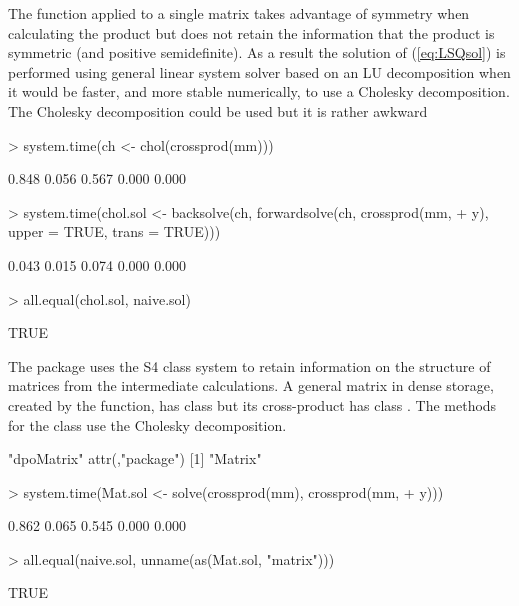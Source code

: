 \documentclass{article}
\begin{document}
The  function applied to a single matrix takes
advantage of symmetry when calculating the product but does not retain
the information that the product is symmetric (and positive
semidefinite).  As a result the solution of (\ref{eq:LSQsol}) is
performed using general linear system solver based on an LU
decomposition when it would be faster, and more stable numerically, to
use a Cholesky decomposition.  The Cholesky decomposition could be used
but it is rather awkward
\begin{Schunk}
\begin{Sinput}
> system.time(ch <- chol(crossprod(mm)))
\end{Sinput}
\begin{Soutput}
[1] 0.848 0.056 0.567 0.000 0.000
\end{Soutput}
\begin{Sinput}
> system.time(chol.sol <- backsolve(ch, forwardsolve(ch, crossprod(mm, 
+     y), upper = TRUE, trans = TRUE)))
\end{Sinput}
\begin{Soutput}
[1] 0.043 0.015 0.074 0.000 0.000
\end{Soutput}
\begin{Sinput}
> all.equal(chol.sol, naive.sol)
\end{Sinput}
\begin{Soutput}
[1] TRUE
\end{Soutput}
\end{Schunk}

The  package uses the S4 class system
\citep{R:Chambers:1998} to retain information on the structure of
matrices from the intermediate calculations.  A general matrix in
dense storage, created by the  function, has class
 but its cross-product has class .
The  methods for the  class use the
Cholesky decomposition.
\begin{Schunk}
\begin{Soutput}
[1] "dpoMatrix"
attr(,"package")
[1] "Matrix"
\end{Soutput}
\begin{Sinput}
> system.time(Mat.sol <- solve(crossprod(mm), crossprod(mm, 
+     y)))
\end{Sinput}
\begin{Soutput}
[1] 0.862 0.065 0.545 0.000 0.000
\end{Soutput}
\begin{Sinput}
> all.equal(naive.sol, unname(as(Mat.sol, "matrix")))
\end{Sinput}
\begin{Soutput}
[1] TRUE
\end{Soutput}
\end{Schunk}
\end{document}
